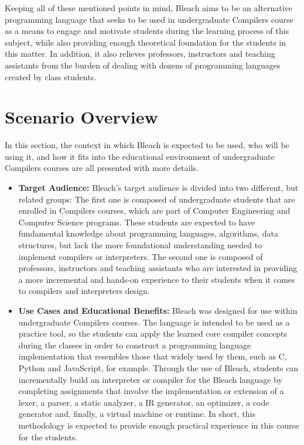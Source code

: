 Keeping all of these mentioned points in mind, Bleach aims to be an alternative programming language that seeks to be used in undergraduate Compilers course as a means to engage and motivate students during the learning process of this subject, while also providing enough theoretical foundation for the students in this matter. In addition, it also relieves professors, instructors and teaching assistants from the burden of dealing with dozens of programming languages created by class students.

\section{Scenario Overview}
In this section, the context in which Bleach is expected to be used, who will be using it, and how it fits into the educational environment of undergraduate Compilers courses are all presented with more details.

\begin{itemize}
    \item \textbf{Target Audience:} Bleach's target audience is divided into two different, but related groups: The first one is composed of undergraduate students that are enrolled in Compilers courses, which are part of Computer Engineering and Computer Science programs. These students are expected to have fundamental knowledge about programming languages, algorithms, data structures, but lack the more foundational understanding needed to implement compilers or interpreters. The second one is composed of professors, instructors and teaching assistants who are interested in providing a more incremental and hands-on experience to their students when it comes to compilers and interpreters design.
    
    \item \textbf{Use Cases and Educational Benefits:} Bleach was designed for use within undergraduate Compilers courses. The language is intended to be used as a practice tool, so the students can apply the learned core compiler concepts during the classes in order to construct a programming language implementation that resembles those that widely used by them, such as C, Python and JavaScript, for example. Through the use of Bleach, students can incrementally build an interpreter or compiler for the Bleach language by completing assignments that involve the implementation or extension of a lexer, a parser, a static analyzer, a IR generator, an optimizer, a code generator and, finally, a virtual machine or runtime. In short, this methodology is expected to provide enough practical experience in this course for the students.
    
\end{itemize}